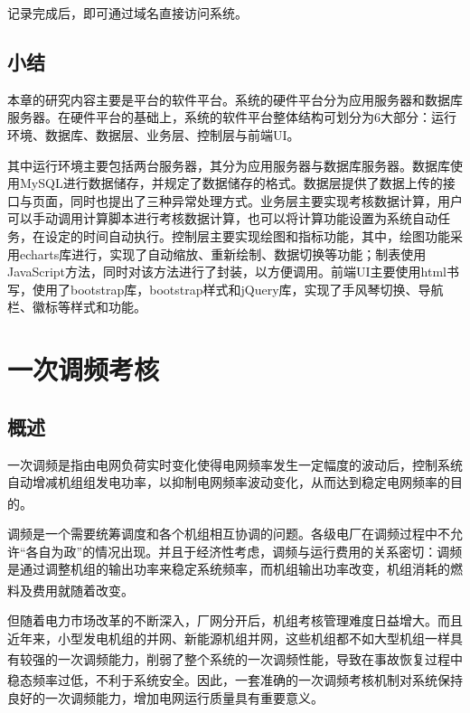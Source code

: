 \documentclass[winfonts,UTF8,a4paper]{ctexart}
\newcommand{\upcite}[1]{{\textsuperscript{\cite{#1}}}}
\begin{document}
记录完成后，即可通过域名直接访问系统。

\subsection{小结}
本章的研究内容主要是平台的软件平台。系统的硬件平台分为应用服务器和数据库服务器。在硬件平台的基础上，系统的软件平台整体结构可划分为6大部分：运行环境、数据库、数据层、业务层、控制层与前端UI。

其中运行环境主要包括两台服务器，其分为应用服务器与数据库服务器。数据库使用MySQL进行数据储存，并规定了数据储存的格式。数据层提供了数据上传的接口与页面，同时也提出了三种异常处理方式。业务层主要实现考核数据计算，用户可以手动调用计算脚本进行考核数据计算，也可以将计算功能设置为系统自动任务，在设定的时间自动执行。控制层主要实现绘图和指标功能，其中，绘图功能采用echarts库进行，实现了自动缩放、重新绘制、数据切换等功能；制表使用JavaScript方法，同时对该方法进行了封装，以方便调用。前端UI主要使用html书写，使用了bootstrap库，bootstrap样式和jQuery库，实现了手风琴切换、导航栏、徽标等样式和功能。






\newpage
\section{一次调频考核}
\subsection{概述}
一次调频是指由电网负荷实时变化使得电网频率发生一定幅度的波动后，控制系统自动增减机组组发电功率，以抑制电网频率波动变化，从而达到稳定电网频率的目的\upcite{2010}。



调频是一个需要统筹调度和各个机组相互协调的问题。各级电厂在调频过程中不允许“各自为政”的情况出现。并且于经济性考虑，调频与运行费用的关系密切：调频是通过调整机组的输出功率来稳定系统频率，而机组输出功率改变，机组消耗的燃料及费用就随着改变\upcite{dlxtzdh}。

但随着电力市场改革的不断深入，厂网分开后，机组考核管理难度日益增大。而且近年来，小型发电机组的并网、新能源机组并网，这些机组都不如大型机组一样具有较强的一次调频能力\upcite{jyzzdnkzhxdccn}，削弱了整个系统的一次调频性能，导致在事故恢复过程中稳态频率过低，不利于系统安全\upcite{20142jzyctp}。因此，一套准确的一次调频考核机制对系统保持良好的一次调频能力，增加电网运行质量具有重要意义。
\end{document}
